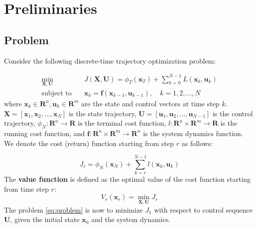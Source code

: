 \section{Preliminaries}
\subsection{Problem}
Consider the following discrete-time trajectory optimization problem:
 
\begin{equation}
    \begin{aligned}
        \min_{\boldsymbol{X},\boldsymbol{U}} & \quad J(\boldsymbol{X}, \boldsymbol{U}) = \phi_T(\mathbf{x}_T) + \sum_{k=0}^{N-1} L(\mathbf{x}_k, \mathbf{u}_k) \\
        \text{subject to} & \quad \mathbf{x}_{k} = \boldsymbol{f}(\mathbf{x}_{k-1}, \mathbf{u}_{k-1}), \quad k = 1, 2, \ldots, N
    \end{aligned}
    \label{eq:problem}
\end{equation}
where $\mathbf{x}_k \in \mathbf{R}^n, \mathbf{u}_k \in \mathbf{R}^m$ are the state and control vectors at time step $k$. $\boldsymbol{X} = [\mathbf{x}_1, \mathbf{x}_2, \ldots, \mathbf{x}_N]$ is the state trajectory, $\boldsymbol{U} = [\mathbf{u}_1, \mathbf{u}_2, \ldots, \mathbf{u}_{N-1}]$ is the control trajectory, $\phi_N: \mathbf{R}^n \to \mathbf{R}$ is the terminal cost function, $l: \mathbf{R}^n \times \mathbf{R}^m \to \mathbf{R}$ is the running cost function, and $\boldsymbol{f}: \mathbf{R}^n \times \mathbf{R}^m \to \mathbf{R}^n$ is the system dynamics function.\\
We denote the cost (return) function starting from step $r$ as follows:

\begin{equation}
    J_r = \phi_N(\mathbf{x}_N) + \sum_{k=r}^{N-1} l(\mathbf{x}_k, \mathbf{u}_k)
\end{equation}
The \textbf{value function} is defined as the optimal value of the cost function starting from time step $r$:
\begin{equation}
    V_r(\mathbf{x}_r) = \min_{\boldsymbol{X},\boldsymbol{U}} J_r
\end{equation}
The problem \ref{eq:problem} is now to minimize $J_1$ with respect to control sequence $\boldsymbol{U}$, given the initial state $\mathbf{x}_0$ and the system dynamics.\\
\begin{center}
\end{center}


